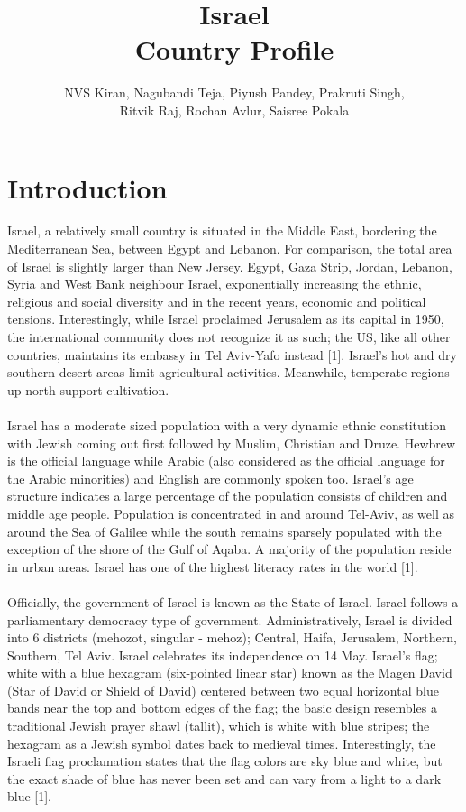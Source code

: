\documentclass[10pt]{article}
\title{Israel\\
Country Profile}
\author{NVS Kiran, Nagubandi Teja, Piyush Pandey, Prakruti Singh,\\
 Ritvik Raj, Rochan Avlur, Saisree Pokala}
\date{\displaydate{date}}
\begin{document}
\maketitle
\newpage

\tableofcontents
\newpage

\section{Introduction}
Israel, a relatively small country is situated in the Middle East, bordering the Mediterranean Sea, between Egypt and Lebanon. For comparison, the total area of Israel is slightly larger than New Jersey. Egypt, Gaza Strip, Jordan, Lebanon, Syria and West Bank neighbour Israel, exponentially increasing the ethnic, religious and social diversity and in the recent years, economic and political tensions. Interestingly, while Israel proclaimed Jerusalem as its capital in 1950, the international community does not recognize it as such; the US, like all other countries, maintains its embassy in Tel Aviv-Yafo instead [1]. Israel's hot and dry southern desert areas limit agricultural activities. Meanwhile, temperate regions up north support cultivation.
\\
\\
Israel has a moderate sized population with a very dynamic ethnic constitution with Jewish coming out first followed by Muslim, Christian and Druze. Hewbrew is the official language while Arabic (also considered as the official language for the Arabic minorities) and English are commonly spoken too. Israel's age structure indicates a large percentage of the population consists of children and middle age people. Population is concentrated in and around Tel-Aviv, as well as around the Sea of Galilee while the south remains sparsely populated with the exception of the shore of the Gulf of Aqaba. A majority of the population reside in urban areas. Israel has one of the highest literacy rates in the world [1].
\\
\\
Officially, the government of Israel is known as the State of Israel. Israel follows a parliamentary democracy type of government. Administratively, Israel is divided into 6 districts (mehozot, singular - mehoz); Central, Haifa, Jerusalem, Northern, Southern, Tel Aviv. Israel celebrates its independence on 14 May. Israel's flag; white with a blue hexagram (six-pointed linear star) known as the Magen David (Star of David or Shield of David) centered between two equal horizontal blue bands near the top and bottom edges of the flag; the basic design resembles a traditional Jewish prayer shawl (tallit), which is white with blue stripes; the hexagram as a Jewish symbol dates back to medieval times. Interestingly, the Israeli flag proclamation states that the flag colors are sky blue and white, but the exact shade of blue has never been set and can vary from a light to a dark blue [1].
\end{document}
